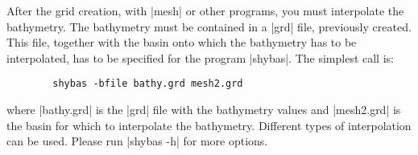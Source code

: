 

After the grid creation, with |mesh| or other programs, you must interpolate the
bathymetry.
The bathymetry must be contained in a |grd| file, previously created.
This file, together with the basin onto which the bathymetry has to be 
interpolated, has to be specified for the program |shybas|.
The simplest call is: 

\begin{verbatim}
        shybas -bfile bathy.grd mesh2.grd
\end{verbatim}

where |bathy.grd| is the |grd| file with the bathymetry values and
|mesh2.grd| is the basin for which to interpolate the bathymetry.
Different types of interpolation can be used. Please run
|shybas -h| for more options.



%


